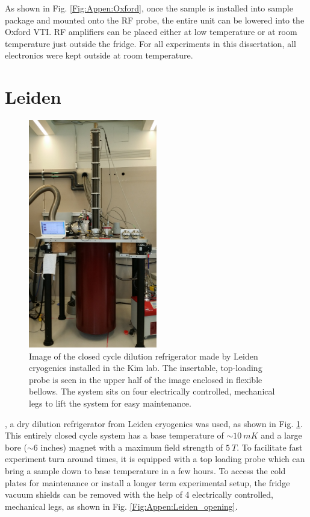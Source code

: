 As shown in Fig. \ref{Fig:Appen:Oxford}, once the sample is installed into sample package and mounted onto the RF probe, the entire unit can be lowered into the Oxford VTI. RF amplifiers can be placed either at low temperature or at room temperature just outside the fridge. For all experiments in this dissertation, all electronics were kept outside at room temperature.


\section{Leiden}
\begin{figure}
\centering
\includegraphics[angle=-90, width = 0.5\textwidth]{figures/appendix/cryostats/Leiden_closed.jpg}
\caption{Image of the closed cycle dilution refrigerator made by Leiden cryogenics installed in the Kim lab. The insertable, top-loading probe is seen in the upper half of the image enclosed in flexible bellows. The system sits on four electrically controlled, mechanical legs to lift the system for easy maintenance.}
\label{Fig:Appen:Leiden_closed}
\end{figure}

, a dry dilution refrigerator from Leiden cryogenics was used, as shown in Fig. \ref{Fig:Appen:Leiden_closed}. This entirely closed cycle system has a base temperature of ${\sim}10~mK$ and a large bore (${\sim}6$ inches) magnet with a maximum field strength of $5~T$. To facilitate fast experiment turn around times, it is equipped with a top loading probe which can bring a sample down to base temperature in a few hours. To access the cold plates for maintenance or install a longer term experimental setup, the fridge vacuum shields can be removed with the help of 4 electrically controlled, mechanical legs, as shown in Fig. \ref{Fig:Appen:Leiden_opening}.  

